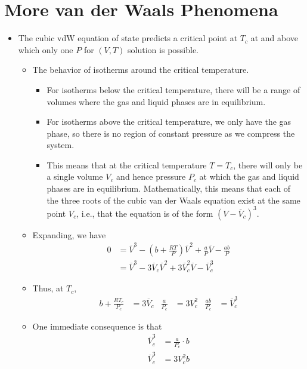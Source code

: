 \documentclass[../notes.tex]{subfiles}
\begin{document}
\section{More van der Waals Phenomena}
\begin{itemize}
    \item {}The cubic vdW equation of state predicts a critical point at $T_c$ at and above which only one $P$ for $(V,T)$ solution is possible.
    \begin{itemize}
        \item The behavior of isotherms around the critical temperature.
        \begin{itemize}
            \item For isotherms below the critical temperature, there will be a range of volumes where the gas and liquid phases are in equilibrium.
            \item For isotherms above the critical temperature, we only have the gas phase, so there is no region of constant pressure as we compress the system.
            \item This means that at the critical temperature $T=T_c$, there will only be a single volume $V_c$ and hence pressure $P_c$ at which the gas and liquid phases are in equilibrium. Mathematically, this means that each of the three roots of the cubic van der Waals equation exist at the same point $V_c$, i.e., that the equation is of the form $(V-\overline{V}_c)^3$.
        \end{itemize}
        \item Expanding, we have
        \begin{align*}
            0 &= \overline{V}^3-\left( b+\frac{RT}{P} \right)\overline{V}^2+\frac{a}{P}\overline{V}-\frac{ab}{P}\\
            &= \overline{V}^3-3\overline{V}_c\overline{V}^2+3\overline{V}_c^2\overline{V}-\overline{V}_c^3
        \end{align*}
        \item Thus, at $T_c$,
        \begin{align*}
            b+\frac{RT_c}{P_c} &= 3\overline{V}_c&
            \frac{a}{P_c} &= 3V_c^2&
            \frac{ab}{P_c} &= \overline{V}_c^3
        \end{align*}
        \item One immediate consequence is that
        \begin{align*}
            \overline{V}_c^3 &= \frac{a}{P_c}\cdot b\\
            \overline{V}_c^3 &= 3V_c^2b\\

\end{align*}
\end{itemize}
\end{itemize}
\end{document}

